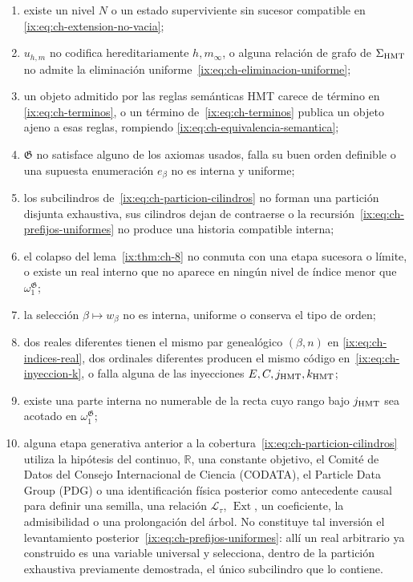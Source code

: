 \begin{enumerate}
\item existe un nivel \(N\) o un estado superviviente sin sucesor compatible en
\eqref{ix:eq:ch-extension-no-vacia};
\item \(u_{h,m}\) no codifica hereditariamente \(h,m_\infty\), o alguna relación
de grafo de \(\Sigma_{\rm HMT}\) no admite la eliminación uniforme~\eqref{ix:eq:ch-eliminacion-uniforme};
\item un objeto admitido por las reglas semánticas HMT carece de término en
\eqref{ix:eq:ch-terminos}, o un término de~\eqref{ix:eq:ch-terminos} publica un objeto ajeno a esas reglas, rompiendo
\eqref{ix:eq:ch-equivalencia-semantica};
\item \(\mathfrak G\) no satisface alguno de los axiomas usados, falla su buen
orden definible o una supuesta enumeración \(e_\beta\) no es interna y
uniforme;
\item los subcilindros de~\eqref{ix:eq:ch-particion-cilindros} no forman una partición disjunta exhaustiva, sus
cilindros dejan de contraerse o la recursión~\eqref{ix:eq:ch-prefijos-uniformes} no produce una
historia compatible interna;
\item el colapso del lema~\ref{ix:thm:ch-8} no conmuta con una etapa sucesora o límite, o existe
un real interno que no aparece en ningún nivel de índice menor que
\(\omega_1^{\mathfrak G}\);
\item la selección \(\beta\mapsto w_\beta\) no es interna, uniforme o conserva
el tipo de orden;
\item dos reales diferentes tienen el mismo par genealógico \((\beta,n)\) en
\eqref{ix:eq:ch-indices-real}, dos ordinales diferentes producen el mismo código en~\eqref{ix:eq:ch-inyeccion-k}, o falla
alguna de las inyecciones \(E,C,j_{\rm HMT},k_{\rm HMT}\);
\item existe una parte interna no numerable de la recta cuyo rango bajo
\(j_{\rm HMT}\) sea acotado en \(\omega_1^{\mathfrak G}\);
\item alguna etapa generativa anterior a la cobertura~\eqref{ix:eq:ch-particion-cilindros} utiliza la hipótesis del continuo,
\(\mathbb R\), una constante objetivo, el Comité de Datos del Consejo
Internacional de Ciencia (CODATA), el Particle Data Group (PDG) o una identificación física
posterior como antecedente causal para definir una semilla, una relación
\(\mathscr L_\tau\), \(\operatorname{Ext}\), un coeficiente, la admisibilidad
o una prolongación del árbol. No constituye tal inversión el levantamiento
posterior~\eqref{ix:eq:ch-prefijos-uniformes}: allí un real arbitrario ya construido es una variable
universal y selecciona, dentro de la partición exhaustiva previamente
demostrada, el único subcilindro que lo contiene.
\end{enumerate}

